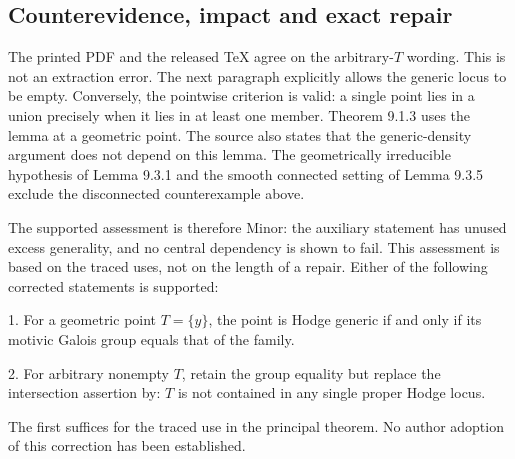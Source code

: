\documentclass[10pt]{article}
\begin{document}
\subsection*{Counterevidence, impact and exact repair}
The printed PDF and the released TeX agree on the arbitrary-\(T\) wording. This is not an extraction error. The next paragraph explicitly allows the generic locus to be empty. Conversely, the pointwise criterion is valid: a single point lies in a union precisely when it lies in at least one member. Theorem 9.1.3 uses the lemma at a geometric point. The source also states that the generic-density argument does not depend on this lemma. The geometrically irreducible hypothesis of Lemma 9.3.1 and the smooth connected setting of Lemma 9.3.5 exclude the disconnected counterexample above.\par
The supported assessment is therefore Minor: the auxiliary statement has unused excess generality, and no central dependency is shown to fail. This assessment is based on the traced uses, not on the length of a repair. Either of the following corrected statements is supported:\par
1. For a geometric point \(T=\{y\}\), the point is Hodge generic if and only if its motivic Galois group equals that of the family.\par
2. For arbitrary nonempty \(T\), retain the group equality but replace the intersection assertion by: \(T\) is not contained in any single proper Hodge locus.\par
The first suffices for the traced use in the principal theorem. No author adoption of this correction has been established.\par
\end{document}
